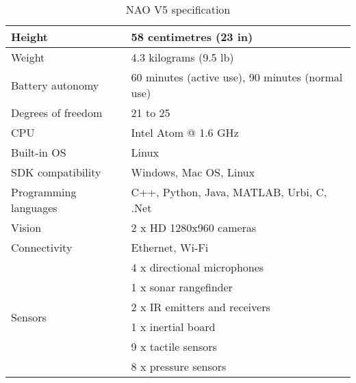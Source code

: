 \begin{table}
	[h] \centering \caption{NAO V5 specification \cite{nao-spec} }  \label{tb:nao:spec} 
	\begin{tabular}
		{|l|l|} \hline Height & 58 centimetres (23 in) \\
		\hline Weight & 4.3 kilograms (9.5 lb) \\
		\hline Battery autonomy & 60 minutes (active use), 90 minutes (normal use) \\
		\hline Degrees of freedom & 21 to 25 \\
		\hline CPU & Intel Atom @ 1.6 GHz \\
		\hline Built-in OS & Linux \\
		\hline SDK compatibility & Windows, Mac OS, Linux \\
		\hline Programming languages & C++, Python, Java, MATLAB, Urbi, C, .Net \\
		\hline Vision & 2 x HD 1280x960 cameras \\
		\hline Connectivity & Ethernet, Wi-Fi \\
		\hline \multirow{6}{*}{Sensors} & 4 x directional microphones \\
		& 1 x sonar rangefinder \\
		& 2 x IR emitters and receivers \\
		& 1 x inertial board \\
		& 9 x tactile sensors \\
		& 8 x pressure sensors \\
		\hline 
	\end{tabular}
\end{table}

